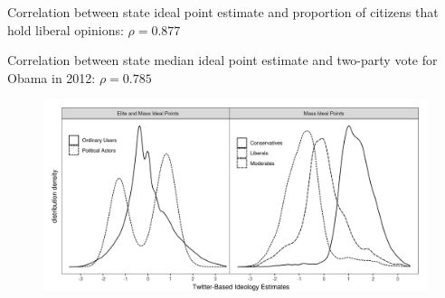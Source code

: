 \documentclass[../template.tex]{subfiles}
\begin{document}
Correlation between state ideal point estimate and proportion of citizens that hold liberal opinions: \( \mathcal{\rho} = 0.877 \)

Correlation between state median ideal point estimate and two-party vote for Obama in 2012: \( \mathcal{\rho} = 0.785 \)

\begin{figure}[h]
\centering
\includegraphics[width=1\textwidth]{images/density grid.png}
\end{figure}
\end{document}
